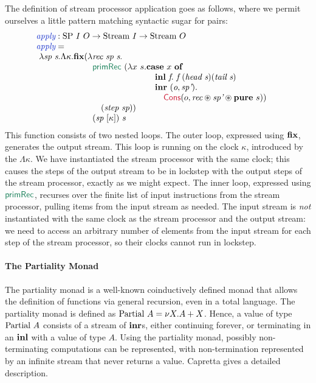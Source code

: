 The definition of stream processor application goes as follows, where
we permit ourselves a little pattern matching syntactic sugar for
pairs:
\begin{displaymath}
  \begin{array}{@{}l}
    \defn{apply} : \tyname{SP}~I~O \to \tyname{Stream}~I \to \tyname{Stream}~O \\
    \defn{apply} = \\
    \ \begin{array}[t]{@{}l@{}l}
      \lambda \ident{sp}~\ident{s}.\Lambda \kappa. \kw{fix}(\lambda&\ident{rec}~\ident{sp}~\ident{s}. \\
      & \elim{primRec}~(\lambda x~s.
      \begin{array}[t]{@{}l}
        \kw{case}~x~\kw{of} \\
        \quad \kw{inl}~\ident{f}.~\ident{f}~(\ident{head}~\ident{s}) (\ident{tail}~\ident{s}) \\
        \quad \kw{inr}~(\ident{o},\ident{sp'}).\\
        \quad \quad \cons{Cons}(o,\ident{rec} \circledast \ident{sp'} \circledast \kw{pure}~s))
      \end{array} \\
      & \quad (\ident{step}~\ident{sp})) \\
      & (\ident{sp}~[\kappa])~s
    \end{array}
  \end{array}
\end{displaymath}
This function consists of two nested loops. The outer loop, expressed
using $\textbf{fix}$, generates the output stream. This loop is running on
the clock $\kappa$, introduced by the $\Lambda \kappa$. We have
instantiated the stream processor with the same clock; this causes the
steps of the output stream to be in lockstep with the output steps of
the stream processor, exactly as we might expect. The inner loop,
expressed using $\elim{primRec}$, recurses over the finite list of
input instructions from the stream processor, pulling items from the
input stream as needed. The input stream is \emph{not} instantiated
with the same clock as the stream processor and the output stream: we
need to access an arbitrary number of elements from the input stream
for each step of the stream processor, so their clocks cannot run in
lockstep.

\paragraph{The Partiality Monad} The partiality monad is a well-known
coinductively defined monad that allows the definition of functions
via general recursion, even in a total language. The partiality monad
is defined as $\textrm{Partial}~A = \nu X. A + X$. Hence, a value of
type $\textrm{Partial}~A$ consists of a stream of $\textbf{inr}$s, either
continuing forever, or terminating in an $\textbf{inl}$ with a value of
type $A$. Using the partiality monad, possibly non-terminating
computations can be represented, with non-termination represented by
an infinite stream that never returns a value. Capretta
\cite{capretta05general} gives a detailed description.

